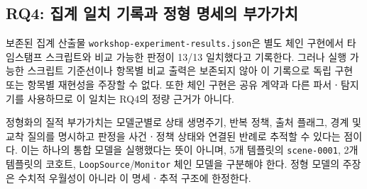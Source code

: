 \subsection{RQ4: 집계 일치 기록과 정형 명세의 부가가치}
\label{sec:results-rq4}

보존된 집계 산출물 \texttt{workshop-experiment-results.json}은 별도 체인 구현에서 타임스탬프 스크립트와  비교 가능한 판정이 13/13 일치했다고 기록한다. 그러나 실행 가능한 스크립트 기준선이나 항목별 비교 출력은 보존되지 않아 이 기록으로 독립 구현 또는 항목별 재현성을 주장할 수 없다. 또한 체인 구현은 공유 계약과 다른 파서ㆍ탐지기를 사용하므로 이 일치는 RQ4의 정량 근거가 아니다.

정형화의 질적 부가가치는 모델군별로 상태 생명주기, 반복 정책, 출처 플래그, 경계 및 교착 질의를 명시하고 판정을 사건ㆍ정책 상태와 연결된 반례로 추적할 수 있다는 점이다. 이는 하나의 통합 모델을 실행했다는 뜻이 아니며, 5개 템플릿의 \texttt{scene-0001}, 2개 템플릿의 코호트, \texttt{LoopSource}/\texttt{Monitor} 체인 모델을 구분해야 한다. 정형 모델의 주장은 수치적 우월성이 아니라 이 명세ㆍ추적 구조에 한정한다.
